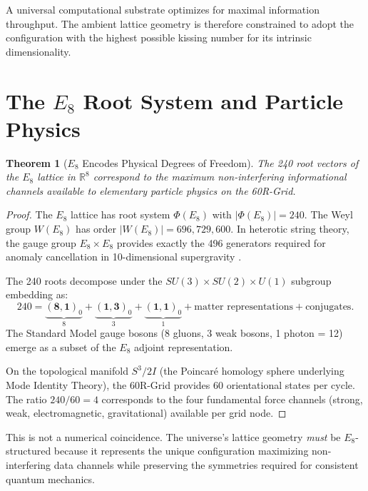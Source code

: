 \documentclass[12pt, a4paper]{article}
\theoremstyle{plain}
\newtheorem{theorem}{Theorem}[section]
\theoremstyle{definition}
\begin{document}
\begin{axiom}
A universal computational substrate optimizes for maximal information throughput. The ambient lattice geometry is therefore constrained to adopt the configuration with the highest possible kissing number for its intrinsic dimensionality.
\end{axiom}

\section{The $E_8$ Root System and Particle Physics}\label{sec:e8physics}

\begin{theorem}[$E_8$ Encodes Physical Degrees of Freedom]
The 240 root vectors of the $E_8$ lattice in $\mathbb{R}^8$ correspond to the maximum non-interfering informational channels available to elementary particle physics on the 60R-Grid.
\end{theorem}

\begin{proof}
The $E_8$ lattice has root system $\Phi(E_8)$ with $|\Phi(E_8)| = 240$. The Weyl group $W(E_8)$ has order $|W(E_8)| = 696{,}729{,}600$. In heterotic string theory, the gauge group $E_8 \times E_8$ provides exactly the 496 generators required for anomaly cancellation in 10-dimensional supergravity \citep{GreenSchwarz1984}.

The 240 roots decompose under the $SU(3) \times SU(2) \times U(1)$ subgroup embedding as:
\begin{equation}
    240 = \underbrace{(\mathbf{8}, \mathbf{1})_0}_{8} + \underbrace{(\mathbf{1}, \mathbf{3})_0}_{3} + \underbrace{(\mathbf{1}, \mathbf{1})_0}_{1} + \text{matter representations} + \text{conjugates}.
\end{equation}
The Standard Model gauge bosons (8 gluons, 3 weak bosons, 1 photon = 12) emerge as a subset of the $E_8$ adjoint representation.

On the topological manifold $S^3/2I$ (the Poincar\'{e} homology sphere underlying Mode Identity Theory), the 60R-Grid provides 60 orientational states per cycle. The ratio $240/60 = 4$ corresponds to the four fundamental force channels (strong, weak, electromagnetic, gravitational) available per grid node.
\end{proof}

\begin{remark}
This is not a numerical coincidence. The universe's lattice geometry \emph{must} be $E_8$-structured because it represents the unique configuration maximizing non-interfering data channels while preserving the symmetries required for consistent quantum mechanics.
\end{remark}
\end{document}
